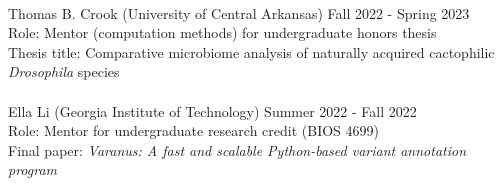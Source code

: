\documentclass{article}
\begin{document}
\\ 
Thomas B. Crook (University of Central Arkansas) \hfill Fall 2022 - Spring 2023 \\
Role: Mentor (computation methods) for undergraduate honors thesis \\
Thesis title: Comparative microbiome analysis of naturally acquired cactophilic \emph{Drosophila} species \\
\\
Ella Li (Georgia Institute of Technology) \hfill Summer 2022 - Fall 2022 \\
Role: Mentor for undergraduate research credit (BIOS 4699) \\
Final paper: \emph{Varanus: A fast and scalable Python-based variant annotation program}\\
\\
\end{document}
